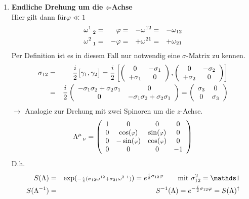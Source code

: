 \begin{enumerate}
\item {\bf Endliche Drehung um die $z$-Achse}\\
Hier gilt dann für$\varphi \ll 1$
\begin{alignat*}{6}
\omega^1_{\ \ 2} &=& \varphi &=& - \omega^{1   2} &=& - \omega_{1 2}\\
\omega^2_{\ \ 1} &=& -\varphi &=& + \omega^{2   1} &=& + \omega_{2 1}
\end{alignat*}
Per Definition ist es in diesem Fall nur notwendig eine $\sigma$-Matrix zu kennen.
\begin{eqnarray*}
\sigma_{1  2} &=& \frac i 2 \big[\gamma_1,\gamma_2\big] = \frac i 2 \left[\left( \begin{array}{cc} 0 &-\sigma_1\\+\sigma_1 & 0 \end{array}\right), \left( \begin{array}{cc} 0 &-\sigma_2\\+\sigma_2 & 0 \end{array}\right)\right]\\
&=& \frac i 2 \left ( \begin{array}{cc}-\sigma_1\sigma_2+\sigma_2\sigma_1 & 0 \\0&-\sigma_1\sigma_2 + \sigma_2 \sigma_1 \end{array}\right) = \left( \begin{array}{cc} \sigma_3 & 0\\0 & \sigma_3 \end{array}\right)
\end{eqnarray*}
$\longrightarrow$ Analogie zur Drehung mit zwei Spinoren um die $z$-Achse.
\begin{eqnarray*}
\Lambda_{\ \ \nu}^{\mu} =  \left( \begin{array}{cccc} 1 &0&0&0\\0&\cos({\scriptstyle\varphi})&\sin({\scriptstyle\varphi})&0\\0&-\sin({\scriptstyle\varphi})&\cos({\scriptstyle\varphi})&0\\0&0&0&-1\end{array}\right)
\end{eqnarray*}
D.h.
\begin{eqnarray*}
S(\Lambda) \g \exp({\scriptstyle -\frac i 4 (\sigma_{1  2}\omega^{1  2} + \sigma_{2 1}\omega^{2 \ 1})}) = e^{\frac i 2 \sigma_{1 2} \varphi} \qquad \text{mit } \sigma_{1  2}^ 2 = \mathds 1\\
S(\Lambda^{-1}) \g S^{-1}(\Lambda) = e^{-\frac i 2 \sigma_{1  2} \varphi} = S(\Lambda)^{\dagger}
\end{eqnarray*}

\end{enumerate}
